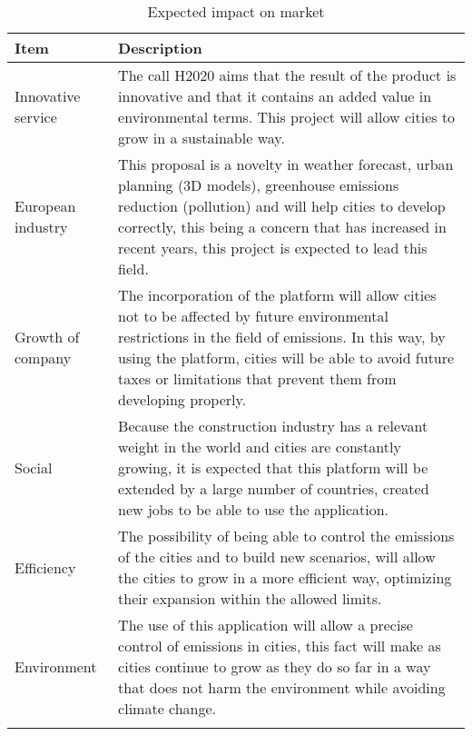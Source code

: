 \begin{longtable}[H]{l p{12cm}}
		
		\toprule[2pt]
		
		\textbf{Item} &  \textbf{Description}\\
		
		\midrule [1.5pt]
		
		Innovative service & The call H2020 aims that the result of the product is innovative and that it contains an added value in environmental terms. This project will allow cities to grow in a sustainable way.\vspace{0.2cm}\\
		
		\midrule
		
		European industry & This proposal is a novelty in weather forecast, urban planning (3D models), greenhouse emissions reduction (pollution) and will help cities to develop correctly, this being a concern that has increased in recent years, this project is expected to lead this field.\vspace{0.2cm}\\
		
		\midrule
		
		Growth of company & The incorporation of the platform will allow cities not to be affected by future environmental restrictions in the field of emissions. In this way, by using the platform, cities will be able to avoid future taxes or limitations that prevent them from developing properly.\vspace{0.2cm}\\
		
		\midrule
		
		Social & Because the construction industry has a relevant weight in the world and cities are constantly growing, it is expected that this platform will be extended by a large number of countries, created new jobs to be able to use the application.\vspace{0.2cm}\\
		
		\midrule
		
		Efficiency & The possibility of being able to control the emissions of the cities and to build new scenarios, will allow the cities to grow in a more efficient way, optimizing their expansion within the allowed limits.\vspace{0.2cm}\\
		
		\midrule
		
		Environment & The use of this application will allow a precise control of emissions in cities, this fact will make as cities continue to grow as they do so far in a way that does not harm the environment while avoiding climate change.\vspace{0.2cm}\\
		
		
		\bottomrule[2pt]
	\caption{Expected impact on market}
\end{longtable}

